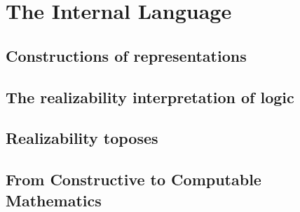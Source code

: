 \chapter{The Internal Language}
\label{chap:internal-language}

\section{Constructions of representations}
\label{sec:constructions}

\section{The realizability interpretation of logic}
\label{sec:realizability-interpretation}

\section{Realizability toposes}
\label{sec:realizability-toposes}

\section{From Constructive to Computable Mathematics}
\label{sec:constructive-math}



